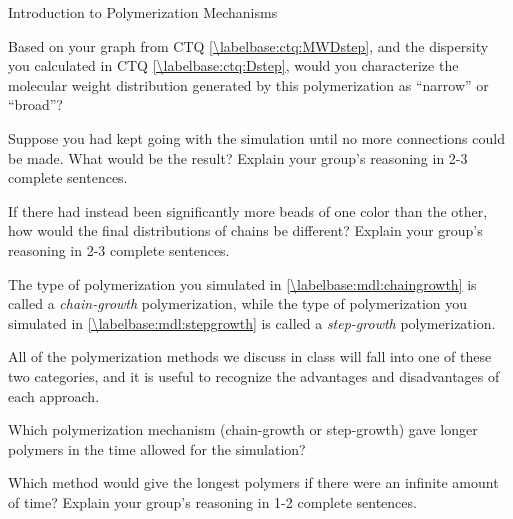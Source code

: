 \begin{activity}{Introduction to Polymerization Mechanisms}
\begin{ctqs}
	\question Based on your graph from CTQ \ref{\labelbase:ctq:MWDstep}, and the dispersity you calculated in CTQ \ref{\labelbase:ctq:Dstep}, would you characterize the molecular weight distribution generated by this polymerization as ``narrow'' or ``broad''?  %
	
		\begin{solution}[1in]
		\end{solution}
	
	\question Suppose you had kept going with the simulation until no more  connections could be made.  What would be the result?  Explain your group's reasoning in 2-3 complete sentences.
	
		\begin{solution}[2in]
		\end{solution}
	
	\question If there had instead been significantly more beads of one color than the other, how would the final distributions of chains be different?  Explain your group's reasoning in 2-3 complete sentences.
	
		\begin{solution}[2in]
		\end{solution}
	
\end{ctqs}

\begin{infobox}
	The type of polymerization you simulated in \ref{\labelbase:mdl:chaingrowth} is called a \emph{chain-growth} polymerization, while the type of polymerization you simulated in  \ref{\labelbase:mdl:stepgrowth} is called a \emph{step-growth} polymerization.
	
	All of the polymerization methods we discuss in class will fall into one of these two categories, and it is useful to recognize the advantages and disadvantages of each approach.
\end{infobox}

\begin{ctqs}
	\question Which polymerization mechanism (chain-growth or step-growth) gave longer polymers in the time allowed for the simulation?
	
		\begin{solution}[0.75in]
		\end{solution}
	
	\question Which method would give the longest polymers if there were an infinite amount of time?  Explain your group's reasoning in 1-2 complete sentences.
	

\end{ctqs}
\end{activity}
